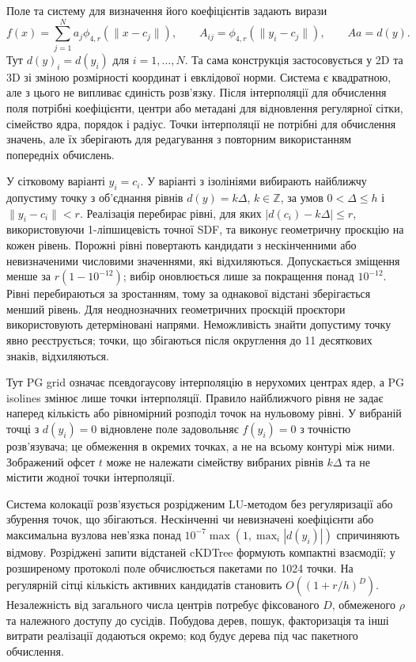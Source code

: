 \documentclass[12pt]{article}
\begin{document}
Поле та систему для визначення його коефіцієнтів задають вирази
\begin{equation}
    f(x)=\sum_{j=1}^{N}a_j\phi_{4,r}(\|x-c_j\|),\qquad
    A_{ij}=\phi_{4,r}(\|y_i-c_j\|),\qquad Aa=d(y).
    \label{eq:fit}
\end{equation}
Тут $d(y)_i=d(y_i)$ для $i=1,\ldots,N$. Та сама конструкція застосовується у 2D та 3D зі зміною розмірності координат і евклідової норми. Система є квадратною, але з цього не випливає єдиність розв'язку. Після інтерполяції для обчислення поля потрібні коефіцієнти, центри або метадані для відновлення регулярної сітки, сімейство ядра, порядок і радіус. Точки інтерполяції не потрібні для обчислення значень, але їх зберігають для редагування з повторним використанням попередніх обчислень.

У сітковому варіанті $y_i=c_i$. У варіанті з ізолініями вибирають найближчу допустиму точку з об'єднання рівнів $d(y)=k\Delta$, $k\in\mathbb Z$, за умов $0<\Delta\le h$ і $\|y_i-c_i\|<r$. Реалізація перебирає рівні, для яких $|d(c_i)-k\Delta|\le r$, використовуючи 1-ліпшицевість точної SDF, та виконує геометричну проєкцію на кожен рівень. Порожні рівні повертають кандидати з нескінченними або невизначеними числовими значеннями, які відхиляються. Допускається зміщення менше за $r(1-10^{-12})$; вибір оновлюється лише за покращення понад $10^{-12}$. Рівні перебираються за зростанням, тому за однакової відстані зберігається менший рівень. Для неоднозначних геометричних проєкцій проєктори використовують детерміновані напрями. Неможливість знайти допустиму точку явно реєструється; точки, що збігаються після округлення до 11 десяткових знаків, відхиляються.

Тут PG grid означає псевдогаусову інтерполяцію в нерухомих центрах ядер, а PG isolines змінює лише точки інтерполяції. Правило найближчого рівня не задає наперед кількість або рівномірний розподіл точок на нульовому рівні. У вибраній точці з $d(y_i)=0$ відновлене поле задовольняє $f(y_i)=0$ з точністю розв'язувача; це обмеження в окремих точках, а не на всьому контурі між ними. Зображений офсет $t$ може не належати сімейству вибраних рівнів $k\Delta$ та не містити жодної точки інтерполяції.

Система колокації розв'язується розрідженим LU-методом без регуляризації або збурення точок, що збігаються. Нескінченні чи невизначені коефіцієнти або максимальна вузлова нев'язка понад $10^{-7}\max(1,\max_i|d(y_i)|)$ спричиняють відмову. Розріджені запити відстаней cKDTree формують компактні взаємодії; у розширеному протоколі поле обчислюється пакетами по 1024 точки. На регулярній сітці кількість активних кандидатів становить $O((1+r/h)^D)$. Незалежність від загального числа центрів потребує фіксованого $D$, обмеженого $\rho$ та належного доступу до сусідів. Побудова дерев, пошук, факторизація та інші витрати реалізації додаються окремо; код будує дерева під час пакетного обчислення.
\end{document}
